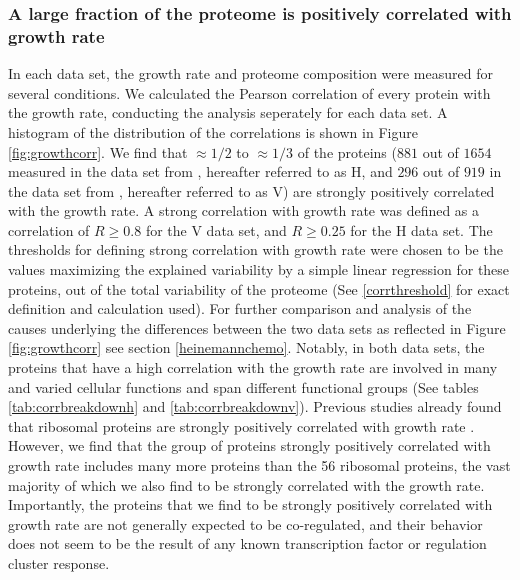 \subsubsection{A large fraction of the proteome is positively correlated with growth rate}
In each data set, the growth rate and proteome composition were measured for several conditions.
We calculated the Pearson correlation of every protein with the growth rate, conducting the analysis seperately for each data set.
A histogram of the distribution of the correlations is shown in Figure \ref{fig:growthcorr}.
We find that $\approx 1/2$ to $\approx 1/3$ of the proteins ($881$ out of $1654$ measured in the data set from \cite{Heinemann2015}, hereafter referred to as H, and $296$ out of $919$ in the data set from \cite{Valgepea2013}, hereafter referred to as V) are strongly positively correlated with the growth rate.
A strong correlation with growth rate was defined as a correlation of $R\geq 0.8$ for the V data set, and $R\geq 0.25$ for the H data set.
The thresholds for defining strong correlation with growth rate were chosen to be the values maximizing the explained variability by a simple linear regression for these proteins, out of the total variability of the proteome (See \ref{corrthreshold} for exact definition and calculation used).
For further comparison and analysis of the causes underlying the differences between the two data sets as reflected in Figure \ref{fig:growthcorr} see section \ref{heinemannchemo}.
Notably, in both data sets, the proteins that have a high correlation with the growth rate are involved in many and varied cellular functions and span different functional groups (See tables \ref{tab:corrbreakdownh} and \ref{tab:corrbreakdownv}).
Previous studies already found that ribosomal proteins are strongly positively correlated with growth rate \cite{Pedersen1978a, ingraham1983growth, Klumpp2008}.
However, we find that the group of proteins strongly positively correlated with growth rate includes many more proteins than the 56 ribosomal proteins, the vast majority of which we also find to be strongly correlated with the growth rate.
Importantly, the proteins that we find to be strongly positively correlated with growth rate are not generally expected to be co-regulated, and their behavior does not seem to be the result of any known transcription factor or regulation cluster response.